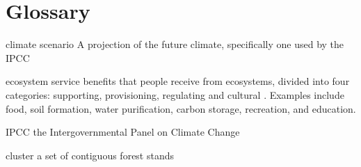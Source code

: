 
\chapter*{Glossary}      %
\thispagestyle{plain}
%
\begin{glossary}

\item[climate scenario] A projection of the future climate, specifically one used by the IPCC

\item[ecosystem service] benefits that people receive from ecosystems, divided into four categories: supporting, provisioning, regulating and cultural \cite{assessment2005ecosystems}. Examples include food, soil formation, water purification, carbon storage, recreation, and education.

\item[IPCC] the Intergovernmental Panel on Climate Change

\item[cluster] a set of contiguous forest stands
 
\end{glossary}
